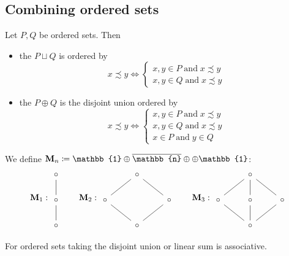 \subsection{Combining ordered sets}
\begin{definition}
Let $P,Q$ be ordered sets. Then
\begin{itemize}
\item the  $P\sqcup Q$ is ordered by
\[ x\precsim y \iff \begin{cases}
x,y\in P \;\text{and}\; x\precsim y \\
x,y\in Q \;\text{and}\; x\precsim y
\end{cases} \]
\item the  $P\oplus Q$ is the disjoint union ordered by
\[ x\precsim y \iff \begin{cases}
x,y\in P \;\text{and}\; x\precsim y \\
x,y\in Q \;\text{and}\; x\precsim y \\
x\in P \;\text{and}\; y\in Q
\end{cases} \]
\end{itemize}
\end{definition}

\begin{example}
We define $\mathbf{M}_n \defeq \mathbb{1}\oplus \overline{\mathbb{n}} \oplus \oplus \mathbb{1}$:
\[ \mathbf{M}_1: \begin{tikzcd}
\circ \ar[d, dash] \\ \circ \ar[d, dash] \\ \circ
\end{tikzcd} \qquad \mathbf{M}_2: \begin{tikzcd}
&\circ \ar[ld, dash] \ar[rd, dash] & \\ \circ \ar[rd, dash] && \circ \ar[ld, dash] \\ &\circ &
\end{tikzcd} \qquad \mathbf{M}_3: \begin{tikzcd}
&\circ \ar[ld, dash] \ar[d,dash] \ar[rd, dash] &\\ \circ \ar[rd, dash]& \circ \ar[d, dash] & \circ \ar[ld, dash] \\ &\circ &
\end{tikzcd} \]
\end{example}

\begin{lemma}
For ordered sets taking the disjoint union or linear sum is associative.
\end{lemma}

